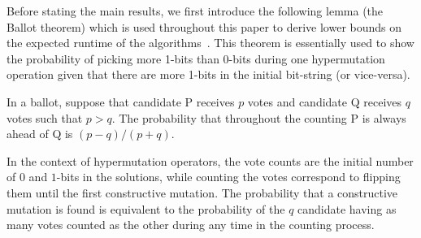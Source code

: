 \documentclass[lettersize,journal]{IEEEtran}
\begin{document}
Before stating the main results, we first introduce the following lemma (the Ballot theorem) which is used throughout this paper to derive lower bounds on the expected runtime of the algorithms~\cite{feller1968,JansenZarges2011,CorusOlivetoYazdani2019TCS}.  This theorem is essentially used to show the probability of picking more 1-bits than 0-bits during one hypermutation operation given that there are more 1-bits in the initial bit-string (or vice-versa). 
%
\begin{lemma}  \label{lem:ballot} 
In a ballot, suppose that candidate P receives $p$ votes and candidate Q receives $q$ votes such that $p>q$. The probability that throughout the counting P is always ahead of Q is $(p-q)/(p+q)$. 
\end{lemma}

{\color{blue}In the context of hypermutation operators, the vote counts are the initial number of $0$ and $1$-bits in the solutions, while counting the votes correspond to flipping them until the first constructive mutation. The probability that a constructive mutation is found is equivalent to the probability of the $q$ candidate having as many votes counted as the other during any time in the counting process.}
\end{document}
